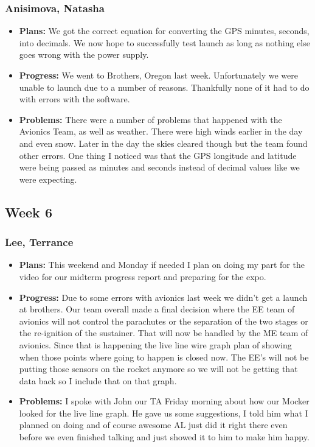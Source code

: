\documentclass[10pt,draftclsnofoot,onecolumn]{IEEEtran}
\begin{document}
\subsubsection{Anisimova, Natasha}
\begin{itemize}
	\item \textbf{Plans: }
	We got the correct equation for converting the GPS minutes, seconds, into decimals. We now hope to successfully test launch as long as nothing else goes wrong with the power supply.
	\item \textbf{Progress:  }
	We went to Brothers, Oregon last week. Unfortunately we were unable to launch due to a number of reasons. Thankfully none of it had to do with errors with the software.
	\item \textbf{Problems: }
	There were a number of problems that happened with the Avionics Team, as well as weather. There were high winds earlier in the day and even snow. Later in the day the skies cleared though but the team found other errors. One thing I noticed was that the GPS longitude and latitude were being passed as minutes and seconds instead of decimal values like we were expecting.
\end{itemize}

\subsection{Week 6}
\subsubsection{Lee, Terrance}
\begin{itemize}
	\item \textbf{Plans: }
	This weekend and Monday if needed I plan on doing my part for the video for our midterm progress report and preparing for the expo.
	\item \textbf{Progress:  }
	Due to some errors with avionics last week we didn't get a launch at brothers. Our team overall made a final decision where the EE team of avionics will not control the parachutes or the separation of the two stages or the re-ignition of the sustainer. That will now be handled by the ME team of avionics. Since that is happening the live line wire graph plan of showing when those points where going to happen is closed now. The EE's will not be putting those sensors on the rocket anymore so we will not be getting that data back so I include that on that graph.
	\item \textbf{Problems: }
	I spoke with John our TA Friday morning about how our Mocker looked for the live line graph. He gave us some suggestions, I told him what I planned on doing and of course awesome AL just did it right there even before we even finished talking and just showed it to him to make him happy.
\end{itemize}
\end{document}
